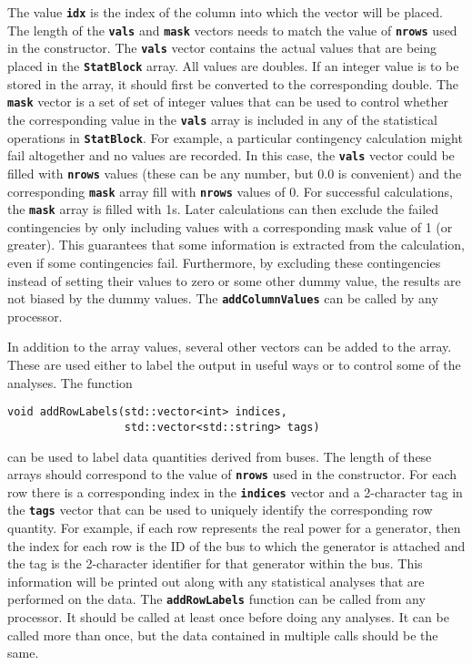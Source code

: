 The value \texttt{\textbf{idx}} is the index of the column into which the vector will be placed. The length of the \texttt{\textbf{vals}} and \texttt{\textbf{mask}} vectors needs to match the value of \texttt{\textbf{nrows}} used in the constructor. The \texttt{\textbf{vals}} vector contains the actual values that are being placed in the \texttt{\textbf{StatBlock}} array. All values are doubles. If an integer value is to be stored in the array, it should first be converted to the corresponding double. The \texttt{\textbf{mask}} vector is a set of set of integer values that can be used to control whether the corresponding value in the \texttt{\textbf{vals}} array is included in any of the statistical operations in \texttt{\textbf{StatBlock}}. For example, a particular contingency calculation might fail altogether and no values are recorded. In this case, the \texttt{\textbf{vals}} vector could be filled with \texttt{\textbf{nrows}} values (these can be any number, but 0.0 is convenient) and the corresponding \texttt{\textbf{mask}} array fill with \texttt{\textbf{nrows}} values of 0. For successful calculations, the \texttt{\textbf{mask}} array is filled with 1s. Later calculations can then exclude the failed contingencies by only including values with a corresponding mask value of 1 (or greater). This guarantees that some information is extracted from the calculation, even if some contingencies fail. Furthermore, by excluding these contingencies instead of setting their values to zero or some other dummy value, the results are not biased by the dummy values. The \texttt{\textbf{addColumnValues}} can be called by any processor.

In addition to the array values, several other vectors can be added to the array. These are used either to label the output in useful ways or to control some of the analyses. The function

{
\color{red}
\begin{Verbatim}[fontseries=b]
void addRowLabels(std::vector<int> indices,
                  std::vector<std::string> tags)
\end{Verbatim}
}

can be used to label data quantities derived from buses. The length of these
arrays should correspond to the value of \texttt{\textbf{nrows}} used in the
constructor. For each row there is a corresponding index in the
\texttt{\textbf{indices}} vector and a 2-character tag in the
\texttt{\textbf{tags}} vector that can be used to uniquely identify the
corresponding row quantity. For example, if each row represents the real power
for a generator, then the index for each row is the ID of the bus to which the generator is attached and the tag is the 2-character identifier for that generator within the bus. This information will be printed out along with any statistical analyses that are performed on the data. The \texttt{\textbf{addRowLabels}} function can be called from any processor. It should be called at least once before doing any analyses. It can be called more than once, but the data contained in multiple calls should be the same.

